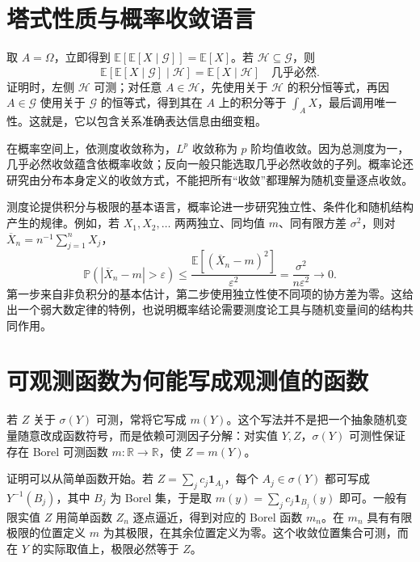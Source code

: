 \documentclass[UTF8,12pt,a4paper,fontset=fandol]{ctexbook}
\begin{document}
\section{塔式性质与概率收敛语言}
取 $A=\Omega$，立即得到 $\mathbb E[\mathbb E[X\mid\mathcal G]]=\mathbb E[X]$。若 $\mathcal H\subseteq\mathcal G$，则
\begin{equation}
 \mathbb E[\mathbb E[X\mid\mathcal G]\mid\mathcal H]
 =\mathbb E[X\mid\mathcal H]\quad\text{几乎必然}.
 \label{eq:mt-tower}
\end{equation}
证明时，左侧 $\mathcal H$ 可测；对任意 $A\in\mathcal H$，先使用关于 $\mathcal H$ 的积分恒等式，再因 $A\in\mathcal G$ 使用关于 $\mathcal G$ 的恒等式，得到其在 $A$ 上的积分等于 $\int_AX$，最后调用唯一性。这就是，它以包含关系准确表达信息由细变粗。

在概率空间上，依测度收敛称为，$L^p$ 收敛称为 $p$ 阶均值收敛。因为总测度为一，几乎必然收敛蕴含依概率收敛；反向一般只能选取几乎必然收敛的子列。概率论还研究由分布本身定义的收敛方式，不能把所有“收敛”都理解为随机变量逐点收敛。

测度论提供积分与极限的基本语言，概率论进一步研究独立性、条件化和随机结构产生的规律。例如，若 $X_1,X_2,\ldots$ 两两独立、同均值 $m$、同有限方差 $\sigma^2$，则对 $\overline X_n=n^{-1}\sum_{j=1}^{n}X_j$，
\[
 \mathbb P(|\overline X_n-m|>\varepsilon)
 \leq\frac{\mathbb E[(\overline X_n-m)^2]}{\varepsilon^2}
 =\frac{\sigma^2}{n\varepsilon^2}\longrightarrow0.
\]
第一步来自非负积分的基本估计，第二步使用独立性使不同项的协方差为零。这给出一个弱大数定律的特例，也说明概率结论需要测度论工具与随机变量间的结构共同作用。

\section{可观测函数为何能写成观测值的函数}
若 $Z$ 关于 $\sigma(Y)$ 可测，常将它写成 $m(Y)$。这个写法并不是把一个抽象随机变量随意改成函数符号，而是依赖可测因子分解：对实值 $Y,Z$，$\sigma(Y)$ 可测性保证存在 Borel 可测函数 $m:\mathbb R\to\mathbb R$，使 $Z=m(Y)$。

证明可以从简单函数开始。若 $Z=\sum_jc_j\mathbf1_{A_j}$，每个 $A_j\in\sigma(Y)$ 都可写成 $Y^{-1}(B_j)$，其中 $B_j$ 为 Borel 集，于是取 $m(y)=\sum_jc_j\mathbf1_{B_j}(y)$ 即可。一般有限实值 $Z$ 用简单函数 $Z_n$ 逐点逼近，得到对应的 Borel 函数 $m_n$。在 $m_n$ 具有有限极限的位置定义 $m$ 为其极限，在其余位置定义为零。这个收敛位置集合可测，而在 $Y$ 的实际取值上，极限必然等于 $Z$。
\end{document}
